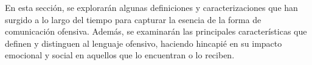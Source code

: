 En esta sección, se explorarán algunas definiciones y caracterizaciones que han surgido a lo largo del tiempo para capturar la esencia de la forma de comunicación ofensiva. Además, se examinarán las principales características que definen y distinguen al lenguaje ofensivo, haciendo hincapié en su impacto emocional y social en aquellos que lo encuentran o lo reciben.